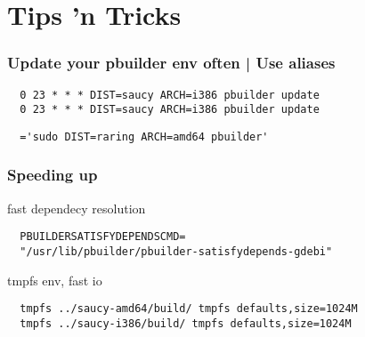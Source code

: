 \documentclass[dvipsnames]{beamer}
\begin{document}
\section[TT]{Tips 'n Tricks}
\begin{frame}[fragile]
  \frametitle{Update your pbuilder env often | Use aliases}
  \begin{center}
  \end{center}
  \begin{verbatim}
  0 23 * * * DIST=saucy ARCH=i386 pbuilder update
  0 23 * * * DIST=saucy ARCH=i386 pbuilder update
  \end{verbatim}
  \begin{center}
  \end{center}
  \begin{verbatim}
  ='sudo DIST=raring ARCH=amd64 pbuilder'
  \end{verbatim}
\end{frame}

\begin{frame}[fragile]
  \frametitle{Speeding up}
  \begin{center}
  {fast dependecy resolution}
  \end{center}
  \begin{center}
  \end{center}
  \begin{verbatim}
  PBUILDERSATISFYDEPENDSCMD=
  "/usr/lib/pbuilder/pbuilder-satisfydepends-gdebi"
  \end{verbatim}
  \begin{center}
  {tmpfs env, fast io}
  \end{center}
  \begin{center}
  \end{center}
  \begin{verbatim}
  tmpfs ../saucy-amd64/build/ tmpfs defaults,size=1024M
  tmpfs ../saucy-i386/build/ tmpfs defaults,size=1024M
  \end{verbatim}
\end{frame}
\end{document}
